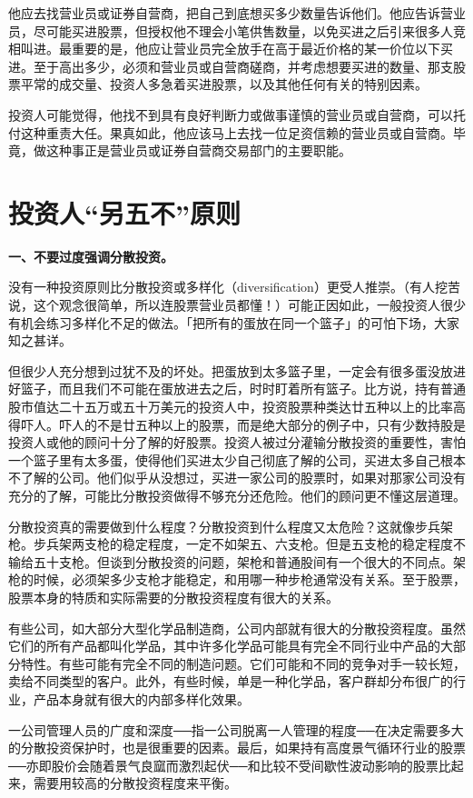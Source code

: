 \documentclass[UTF8,a4paper,zihao=-4,fontset = windows]{ctexart} %
\begin{document}
他应去找营业员或证券自营商，把自己到底想买多少数量告诉他们。他应告诉营业员，尽可能买进股票，但授权他不理会小笔供售数量，以免买进之后引来很多人竞相叫进。最重要的是，他应让营业员完全放手在高于最近价格的某一价位以下买进。至于高出多少，必须和营业员或自营商磋商，并考虑想要买进的数量、那支股票平常的成交量、投资人多急着买进股票，以及其他任何有关的特别因素。

投资人可能觉得，他找不到具有良好判断力或做事谨慎的营业员或自营商，可以托付这种重责大任。果真如此，他应该马上去找一位足资信赖的营业员或自营商。毕竟，做这种事正是营业员或证券自营商交易部门的主要职能。

\section{投资人“另五不”原则}

\textbf{一、不要过度强调分散投资。}


没有一种投资原则比分散投资或多样化（diversification）更受人推崇。（有人挖苦说，这个观念很简单，所以连股票营业员都懂！）可能正因如此，一般投资人很少有机会练习多样化不足的做法。「把所有的蛋放在同一个篮子」的可怕下场，大家知之甚详。

但很少人充分想到过犹不及的坏处。把蛋放到太多篮子里，一定会有很多蛋没放进好篮子，而且我们不可能在蛋放进去之后，时时盯着所有篮子。比方说，持有普通股市值达二十五万或五十万美元的投资人中，投资股票种类达廿五种以上的比率高得吓人。吓人的不是廿五种以上的股票，而是绝大部分的例子中，只有少数持股是投资人或他的顾问十分了解的好股票。投资人被过分灌输分散投资的重要性，害怕一个篮子里有太多蛋，使得他们买进太少自己彻底了解的公司，买进太多自己根本不了解的公司。他们似乎从没想过，买进一家公司的股票时，如果对那家公司没有充分的了解，可能比分散投资做得不够充分还危险。他们的顾问更不懂这层道理。

分散投资真的需要做到什么程度？分散投资到什么程度又太危险？这就像步兵架枪。步兵架两支枪的稳定程度，一定不如架五、六支枪。但是五支枪的稳定程度不输给五十支枪。但谈到分散投资的问题，架枪和普通股间有一个很大的不同点。架枪的时候，必须架多少支枪才能稳定，和用哪一种步枪通常没有关系。至于股票，股票本身的特质和实际需要的分散投资程度有很大的关系。

有些公司，如大部分大型化学品制造商，公司内部就有很大的分散投资程度。虽然它们的所有产品都叫化学品，其中许多化学品可能具有完全不同行业中产品的大部分特性。有些可能有完全不同的制造问题。它们可能和不同的竞争对手一较长短，卖给不同类型的客户。此外，有些时候，单是一种化学品，客户群却分布很广的行业，产品本身就有很大的内部多样化效果。

一公司管理人员的广度和深度──指一公司脱离一人管理的程度──在决定需要多大的分散投资保护时，也是很重要的因素。最后，如果持有高度景气循环行业的股票──亦即股价会随着景气良窳而激烈起伏──和比较不受间歇性波动影响的股票比起来，需要用较高的分散投资程度来平衡。
\end{document}
